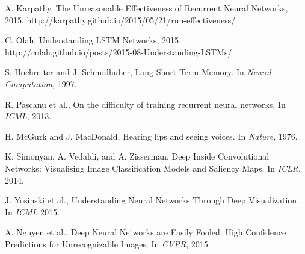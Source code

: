 \begin{thebibliography}{999}
A. Karpathy, The Unreasonable Effectiveness of Recurrent Neural Networks, 2015. http://karpathy.github.io/2015/05/21/rnn-effectiveness/

C. Olah, Understanding LSTM Networks, 2015. \\http://colah.github.io/posts/2015-08-Understanding-LSTMs/

S. Hochreiter and J. Schmidhuber, Long Short-Term Memory. In \textit{Neural Computation}, 1997.

R. Pascanu et al., On the difficulty of training recurrent neural networks. In \textit{ICML}, 2013.

H. McGurk and J. MacDonald, Hearing lips and seeing voices. In \textit{Nature}, 1976.

K. Simonyan, A. Vedaldi, and A. Zisserman, Deep Inside Convolutional Networks: Visualising Image Classification Models and Saliency Maps. In \textit{ICLR}, 2014.

J. Yosinski et al., Understanding Neural Networks Through Deep Visualization. In \textit{ICML} 2015.

A. Nguyen et al., Deep Neural Networks are Easily Fooled: High Confidence Predictions for Unrecognizable Images. In \textit{CVPR}, 2015.

\end{thebibliography}




